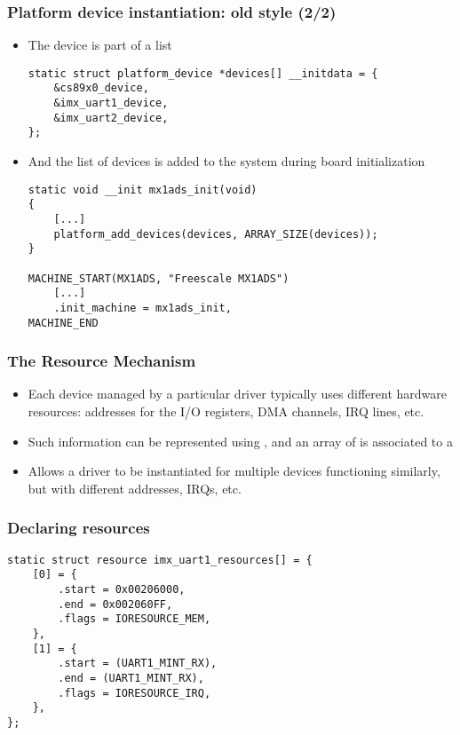 \begin{frame}[fragile]
  \frametitle{Platform device instantiation: old style (2/2)}
  \begin{itemize}
  \item The device is part of a list
    \begin{block}{}
  \begin{verbatim}
static struct platform_device *devices[] __initdata = {
    &cs89x0_device,
    &imx_uart1_device,
    &imx_uart2_device,
};
  \end{verbatim}
  \end{block}
  \item And the list of devices is added to the system during
    board initialization
    \begin{block}{}
  \begin{verbatim}
static void __init mx1ads_init(void)
{
    [...]
    platform_add_devices(devices, ARRAY_SIZE(devices));
}

MACHINE_START(MX1ADS, "Freescale MX1ADS")
    [...]
    .init_machine = mx1ads_init,
MACHINE_END
  \end{verbatim}
  \end{block}
  \end{itemize}
\end{frame}

\begin{frame}
  \frametitle{The Resource Mechanism}
  \begin{itemize}
  \item Each device managed by a particular driver typically uses
    different hardware resources: addresses for the I/O registers, DMA
    channels, IRQ lines, etc.
  \item Such information can be represented using
    , and an array of  is
    associated to a 
  \item Allows a driver to be instantiated for multiple devices
    functioning similarly, but with different addresses, IRQs, etc.
  \end{itemize}
\end{frame}

\begin{frame}[fragile]
  \frametitle{Declaring resources}
  \begin{block}{}
  \begin{verbatim}
static struct resource imx_uart1_resources[] = {
    [0] = {
        .start = 0x00206000,
        .end = 0x002060FF,
        .flags = IORESOURCE_MEM,
    },
    [1] = {
        .start = (UART1_MINT_RX),
        .end = (UART1_MINT_RX),
        .flags = IORESOURCE_IRQ,
    },
};
\end{verbatim}
\end{block}
\end{frame}

